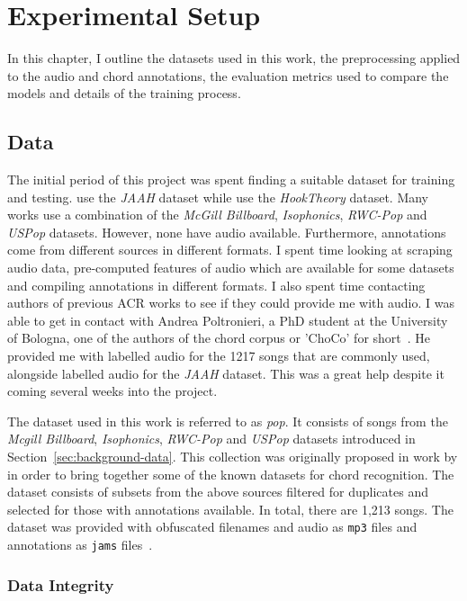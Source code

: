 \chapter{Experimental Setup}

In this chapter, I outline the datasets used in this work, the preprocessing applied to the audio and chord annotations, the evaluation metrics used to compare the models and details of the training process.

\section{Data}

The initial period of this project was spent finding a suitable dataset for training and testing. \citet{JAAH} use the \emph{JAAH} dataset while \citet{MelodyTranscriptionViaGenerativePreTraining} use the \emph{HookTheory} dataset. Many works use a combination of the \emph{McGill Billboard}, \emph{Isophonics}, \emph{RWC-Pop} and \emph{USPop} datasets. However, none have audio available. Furthermore, annotations come from different sources in different formats. I spent time looking at scraping audio data, pre-computed features of audio which are available for some datasets and compiling annotations in different formats. I also spent time contacting authors of previous ACR works to see if they could provide me with audio. I was able to get in contact with Andrea Poltronieri, a PhD student at the University of Bologna, one of the authors of the chord corpus or 'ChoCo' for short~\citep{Choco}. He provided me with labelled audio for the 1217 songs that are commonly used, alongside labelled audio for the \emph{JAAH} dataset. This was a great help despite it coming several weeks into the project.

The dataset used in this work is referred to as \emph{pop}. It consists of songs from the \emph{Mcgill Billboard}, \emph{Isophonics}, \emph{RWC-Pop} and \emph{USPop} datasets introduced in Section~\ref{sec:background-data}. This collection was originally proposed in work by \citet{FourTimelyInsights} in order to bring together some of the known datasets for chord recognition. The dataset consists of subsets from the above sources filtered for duplicates and selected for those with annotations available. In total, there are 1,213 songs. The dataset was provided with obfuscated filenames and audio as \texttt{mp3} files and annotations as \texttt{jams} files~\citep{JAMS}. 

\subsection{Data Integrity}\label{sec:data-integrity}

